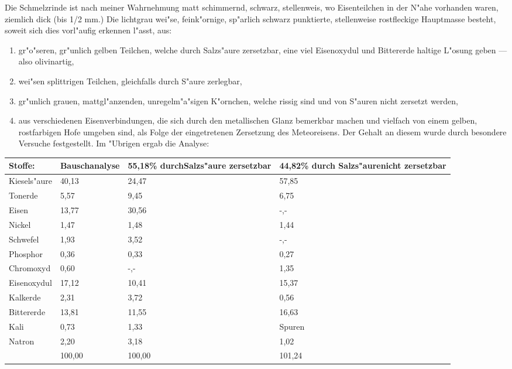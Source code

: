 \documentclass[a4paper, 11pt, oneside]{article}
\begin{document}
Die Schmelzrinde ist nach meiner Wahrnehmung matt schimmernd, schwarz, stellenweis, wo Eisenteilchen in der N"ahe vorhanden waren, ziemlich dick (bis 1/2 mm.) Die lichtgrau wei"se, feink"ornige, sp"arlich schwarz punktierte, stellenweise rostfleckige Hauptmasse besteht, soweit sich dies vorl"aufig erkennen l"asst, aus:
\begin{enumerate}
    \item gr"o"seren, gr"unlich gelben Teilchen, welche durch Salzs"aure zersetzbar, eine viel Eisenoxydul und Bittererde haltige L"osung geben --- also olivinartig,
    \item wei"sen splittrigen Teilchen, gleichfalls durch S"aure zerlegbar,
    \item gr"unlich grauen, mattgl"anzenden, unregelm"a"sigen K"ornchen, welche rissig sind und von S"auren nicht zersetzt werden,
    \item aus verschiedenen Eisenverbindungen, die sich durch den metallischen Glanz bemerkbar machen und vielfach von einem gelben, rostfarbigen Hofe umgeben sind, als Folge der eingetretenen Zersetzung des Meteoreisens. Der Gehalt an diesem wurde durch besondere Versuche festgestellt. Im "Ubrigen ergab die Analyse:
\end{enumerate}
\begin{center}
\begin{tabular}{ |p{19mm}|p{22mm}|p{33mm}|p{33mm}| }
    \hline
    Stoffe: & Bauschanalyse & 55,18\% durch\newline Salzs"aure zersetzbar & 44,82\% durch Salzs"aurenicht zersetzbar\\
    \hline\hline
    Kiesels"aure & 40,13 & 24,47 & 57,85\\\hline
    Tonerde & 5,57 & 9,45 & 6,75\\\hline
    Eisen & 13,77 & 30,56 & -,-\\\hline
    Nickel & 1,47 & 1,48 & 1,44\\\hline
    Schwefel & 1,93 & 3,52 & -,-\\\hline
    Phosphor & 0,36 & 0,33 & 0,27\\\hline
    Chromoxyd & 0,60 & -,- & 1,35\\\hline
    Eisenoxydul & 17,12 & 10,41 & 15,37\\\hline
    Kalkerde & 2,31 & 3,72 & 0,56\\\hline
    Bittererde & 13,81 & 11,55 & 16,63\\\hline
    Kali & 0,73 & 1,33 & Spuren\\\hline
    Natron & 2,20 & 3,18 & 1,02\\\hline
    & 100,00 & 100,00 & 101,24\\
    \hline
\end{tabular}
\end{center}
\end{document}
